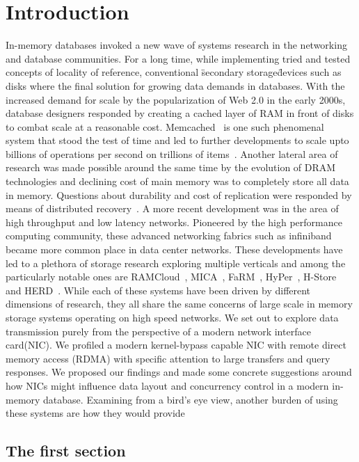 
\chapter{Introduction}
In-memory databases invoked a new wave of systems research in the 
networking and database communities. For a long time, while implementing tried
and tested concepts of locality of reference, conventional \"secondary storage\" devices
such as disks where the final solution for growing data demands in databases. With the 
increased demand for scale by the popularization of Web 2.0 in the early 2000s, 
database designers responded by creating a cached layer of RAM in front of disks
to combat scale at a reasonable cost. Memcached~\cite{memcached-orig}
is one such phenomenal system that stood the test of time and led to further developments
to scale upto billions of operations per second on trillions of items~\cite{nishtala2013scaling}.
Another lateral area of research was made possible around the same time by the 
evolution of DRAM technologies and declining cost of main memory was to completely
store all data in memory. Questions about durability and cost of replication 
were responded by means of distributed recovery~\cite{ongaro2011fast}. 
A more recent development was in the area of high throughput and low latency networks. 
Pioneered by the high performance computing community, these advanced networking fabrics 
such as infiniband~\cite{pfister2001introduction} became more common place in 
data center networks. These developments have led to a plethora of storage research 
exploring multiple verticals and among the particularly notable ones are RAMCloud~\cite{ramcloud},
MICA~\cite{mica}, FaRM~\cite{farm}, HyPer~\cite{hyper}, H-Store~\cite{hstore} 
and HERD~\cite{herd}. While each of these systems have been driven by different dimensions 
of research, they all share the same concerns of large scale in memory storage systems 
operating on high speed networks. We set out to explore data transmission purely from the
perspective of a modern network interface card(NIC). We profiled a modern kernel-bypass capable NIC 
with remote direct memory access (RDMA) with specific attention to large transfers
and query responses. We proposed our findings and made some concrete suggestions 
around how NICs might influence data layout and concurrency control in a modern 
in-memory database. Examining from a bird's eye view, another burden of using these 
systems are how they would provide 


\section{The first section}

